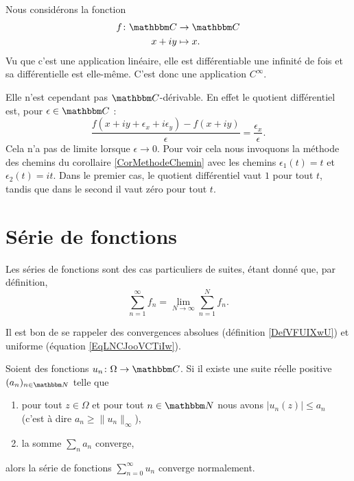 \begin{example}
    Nous considérons la fonction
    \begin{equation}
        \begin{aligned}
            f\colon \eC&\to \eC \\
            x+iy&\mapsto x. 
        \end{aligned}
    \end{equation}
    Vu que c'est une application linéaire, elle est différentiable une infinité de fois et sa différentielle est elle-même. C'est donc une application \( C^{\infty}\).

    Elle n'est cependant pas \( \eC\)-dérivable. En effet le quotient différentiel est, pour \( \epsilon\in \eC\) :
    \begin{equation}
        \frac{ f(x+iy+\epsilon_x+i\epsilon_y)-f(x+iy) }{ \epsilon }=\frac{ \epsilon_x }{ \epsilon }.
    \end{equation}
    Cela n'a pas de limite lorsque \( \epsilon\to 0\). Pour voir cela nous invoquons la méthode des chemins du corollaire \ref{CorMethodeChemin} avec les chemins \( \epsilon_1(t)=t\) et \( \epsilon_2(t)=it\). Dans le premier cas, le quotient différentiel vaut \( 1\) pour tout \( t\), tandis que dans le second il vaut zéro pour tout \( t\).
\end{example}


\section{Série de fonctions}

Les séries de fonctions sont des cas particuliers de suites, étant donné que, par définition,
\begin{equation}
    \sum_{n=1}^{\infty}f_n=\lim_{N\to \infty} \sum_{n=1}^{N}f_n.
\end{equation}

Il est bon de se rappeler des convergences absolues (définition \ref{DefVFUIXwU}) et uniforme (équation \ref{EqLNCJooVCTiIw}).

\begin{lemma}
    Soient des fonctions \( u_n\colon \Omega\to \eC\). Si il existe une suite réelle positive \( (a_n)_{n\in \eN}\) telle que
    \begin{enumerate}
        \item
            pour tout \( z\in \Omega\) et pour tout \( n\in \eN\) nous avons \( | u_n(z) |\leq a_n\) (c'est à dire \( a_n\geq \| u_n \|_{\infty}\)),
        \item
            la somme \( \sum_{n}a_n\) converge,
    \end{enumerate}
    alors la série de fonctions \( \sum_{n=0}^{\infty}u_n\) converge normalement.
\end{lemma}


